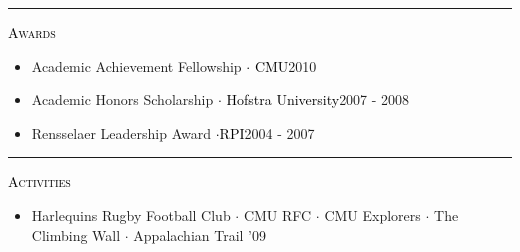 \documentclass[letterpaper]{article}
\def\firstWidth{.10\textwidth}
\def\secondWidth{.90\textwidth}
\begin{document}
\vfill \begin{center}  \large \hrule \end{center}  \vfill

\begin{minipage}{\firstWidth}
\large \textcolor{Black}{\textsc{Awards}} %
\end{minipage}
\begin{minipage}{\secondWidth}
\begin{itemize}
\item{Academic Achievement Fellowship \textcolor{Black}{$\cdot$ CMU}\hfill2010 }
\item{Academic Honors Scholarship \textcolor{Black}{$\cdot$ Hofstra University}\hfill2007 - 2008}
\item{Rensselaer Leadership Award \textcolor{Black}{$\cdot$RPI}\hfill2004 - 2007 }
\end{itemize}
\end{minipage}
\vfill
\begin{center}  \large \hrule \end{center}  
\vfill

\begin{minipage}{\firstWidth}
\large \textcolor{Black}{\textsc{Activities}}
\end{minipage}
\begin{minipage}{\secondWidth}
    \begin{itemize}
    \item{\small Harlequins Rugby Football Club $\cdot$ CMU RFC $\cdot$ CMU Explorers $\cdot$ The Climbing Wall 
    $\cdot$  Appalachian Trail '09} 
    \end{itemize}
\end{minipage}
\end{document}
